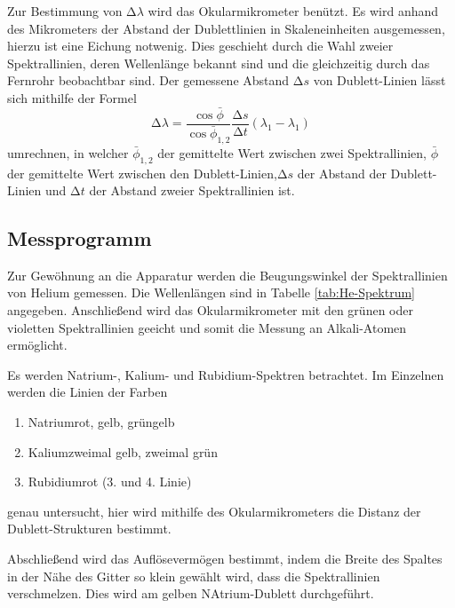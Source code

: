 Zur Bestimmung von $\mathup{\Delta}\lambda$ wird das Okularmikrometer benützt.
Es wird anhand des Mikrometers der Abstand der Dublettlinien in Skaleneinheiten ausgemessen, hierzu ist eine Eichung notwenig.
Dies geschieht durch die Wahl zweier Spektrallinien, deren Wellenlänge bekannt sind und die gleichzeitig durch das Fernrohr beobachtbar sind.
Der gemessene Abstand $\mathup{\Delta}s$ von Dublett-Linien lässt sich mithilfe der Formel
\begin{equation}
	\mathup{\Delta}\lambda=\frac{\cos{\bar\phi}}{\cos{\bar\phi_{1,2}}}\frac{\mathup{\Delta}s}{\mathup{\Delta}t}(\lambda_1-\lambda_1)
\end{equation}
umrechnen, in welcher $\bar\phi_{1,2}$ der gemittelte Wert zwischen zwei Spektrallinien, $\bar\phi$ der gemittelte Wert zwischen den Dublett-Linien,$\mathup{\Delta}s$ der Abstand der Dublett-Linien und $\mathup{\Delta}t$ der Abstand zweier Spektrallinien ist.

\subsection{Messprogramm}
Zur Gewöhnung an die Apparatur werden die Beugungswinkel der Spektrallinien von Helium gemessen.
Die Wellenlängen sind in Tabelle \ref{tab:He-Spektrum} angegeben.
Anschließend wird das Okularmikrometer mit den grünen oder violetten Spektrallinien geeicht und somit die Messung an Alkali-Atomen ermöglicht.

Es werden Natrium-, Kalium- und Rubidium-Spektren betrachtet.
Im Einzelnen werden die Linien der Farben
\begin{enumerate}
	\item{Natrium}{rot, gelb, grüngelb}
	\item{Kalium}{zweimal gelb, zweimal grün}
	\item{Rubidium}{rot (3. und 4. Linie)}
\end{enumerate}
genau untersucht, hier wird mithilfe des Okularmikrometers die Distanz der Dublett-Strukturen bestimmt.

Abschließend wird das Auflösevermögen bestimmt, indem die Breite des Spaltes in der Nähe des Gitter so klein gewählt wird, dass die Spektrallinien verschmelzen.
Dies wird am gelben NAtrium-Dublett durchgeführt.